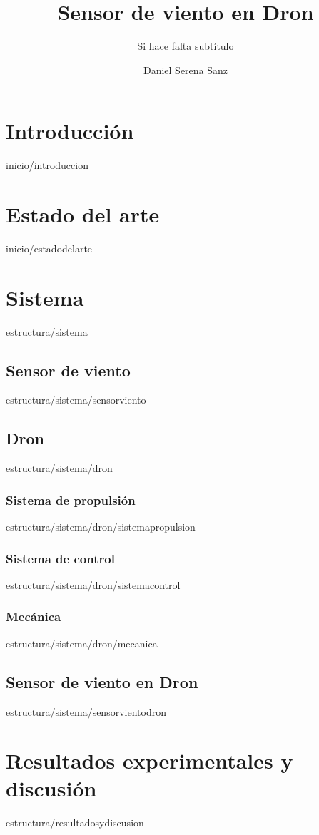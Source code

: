 \documentclass[epsbased,copyright,final,printable,covers,extendedindex,firstnumbered,tfg,gnuplot]{tfgtfmthesisuam}
\title{Sensor de viento en Dron}
\subtitle{Si hace falta subtítulo}
\author{Daniel Serena Sanz}
\begin{document}
\chapter{Introducción\label{CAP:INTRODUCCION}}{inicio/introduccion}
\chapter{Estado del arte\label{CAP:ESTADODELARTE}}{inicio/estadodelarte}
\chapter{Sistema\label{CAP:SISTEMA}}{estructura/sistema}

	\section{Sensor de viento\label{SEC:SENSORVIENTO}}{estructura/sistema/sensorviento}

	\section{Dron\label{SEC:DRON}}{estructura/sistema/dron}
		\subsection{Sistema de propulsión\label{SS:SISTPROPULSION}}{estructura/sistema/dron/sistemapropulsion}
		\subsection{Sistema de control\label{SS:SISTCONTROL}}{estructura/sistema/dron/sistemacontrol}
		\subsection{Mecánica\label{SS:MECANICA}}{estructura/sistema/dron/mecanica}
		
	\section{Sensor de viento en Dron\label{SEC:SENSORVIENTODRON}}{estructura/sistema/sensorvientodron}

\chapter{Resultados experimentales y discusión\label{CAP:RESEXPYDISC}}{estructura/resultadosydiscusion}
\end{document}
